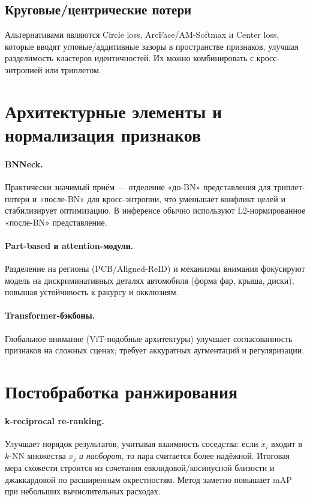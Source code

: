 \subsection{Круговые/центрические потери}
Альтернативами являются Circle loss, ArcFace/AM-Softmax и Center loss, которые вводят угловые/аддитивные зазоры в пространстве признаков, улучшая разделимость кластеров идентичностей. Их можно комбинировать с кросс-энтропией или триплетом.

\section{Архитектурные элементы и нормализация признаков}
\paragraph{BNNeck.} Практически значимый приём — отделение «до-BN» представления для триплет-потери и «после-BN» для кросс-энтропии, что уменьшает конфликт целей и стабилизирует оптимизацию. В инференсе обычно используют L2-нормированное «после-BN» представление. %
\paragraph{Part-based и attention-модули.} Разделение на регионы (PCB/Aligned-ReID) и механизмы внимания фокусируют модель на дискриминативных деталях автомобиля (форма фар, крыша, диски), повышая устойчивость к ракурсу и окклюзиям.
\paragraph{Transformer-бэкбоны.} Глобальное внимание (ViT-подобные архитектуры) улучшает согласованность признаков на сложных сценах; требует аккуратных аугментаций и регуляризации.

\section{Постобработка ранжирования}
\paragraph{k-reciprocal re-ranking.} Улучшает порядок результатов, учитывая взаимность соседства: если \(x_i\) входит в \(k\)-NN множества \(x_j\) \emph{и наоборот}, то пара считается более надёжной. Итоговая мера схожести строится из сочетания евклидовой/косинусной близости и джаккардовой по расширенным окрестностям. Метод заметно повышает mAP при небольших вычислительных расходах. %

